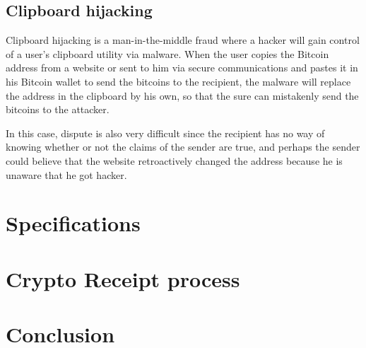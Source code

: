 \subsection{Clipboard hijacking}
Clipboard hijacking is a man-in-the-middle fraud where a hacker will gain control of a user’s clipboard utility via malware. When the user copies the Bitcoin address from a website or sent to him via secure communications and pastes it in his Bitcoin wallet to send the bitcoins to the recipient, the malware will replace the address in the clipboard by his own, so that the sure can mistakenly send the bitcoins to the attacker.

In this case, dispute is also very difficult since the recipient has no way of knowing whether or not the claims of the sender are true, and perhaps the sender could believe that the website retroactively changed the address because he is unaware that he got hacker.


\section{Specifications}



\section{Crypto Receipt process}




\section{Conclusion}
